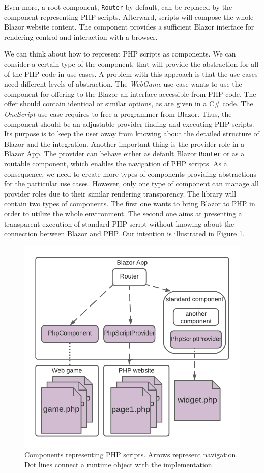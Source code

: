 Even more, a root component, \texttt{Router} by default, can be replaced by the component representing PHP scripts.
Afterward, scripts will compose the whole Blazor website content.
The component provides a sufficient Blazor interface for rendering control and interaction with a browser. 
\par
We can think about how to represent PHP scripts as components.
We can consider a certain type of the component, that will provide the abstraction for all of the PHP code in use cases.
A problem with this approach is that the use cases need different levels of abstraction.
The \textit{WebGame} use case wants to use the component for offering to the Blazor an interface accessible from PHP code.
The offer should contain identical or similar options, as are given in a C\# code.
The \textit{OneScript} use case requires to free a programmer from Blazor.
Thus, the component should be an adjustable provider finding and executing PHP scripts.
Its purpose is to keep the user away from knowing about the detailed structure of Blazor and the integration.
Another important thing is the provider role in a Blazor App.
The provider can behave either as default Blazor \texttt{Router} or as a routable component, which enables the navigation of PHP scripts.
As a consequence, we need to create more types of components providing abstractions for the particular use cases.
However, only one type of component can manage all provider roles due to their similar rendering transparency.
The library will contain two types of components.
The first one wants to bring Blazor to PHP in order to utilize the whole environment.
The second one aims at presenting a transparent execution of standard PHP script without knowing about the connection between Blazor and PHP.
Our intention is illustrated in Figure \ref{img12:component}.
\par
\begin{figure}
\centering
\includegraphics[scale=0.9]{./img/Components}
\caption{Components representing PHP scripts. Arrows represent navigation. 
Dot lines connect a runtime object with the implementation.
}
\label{img12:component}
\end{figure} 
